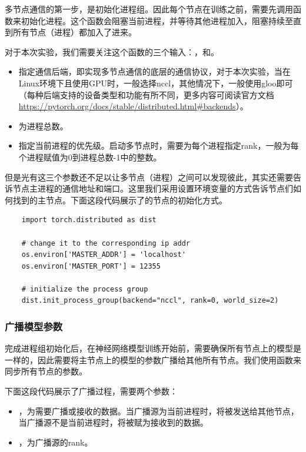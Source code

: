 多节点通信的第一步，是初始化进程组。因此每个节点在训练之前，需要先调用函数来初始化进程。这个函数会阻塞当前进程，并等待其他进程加入，阻塞持续至直到所有节点（进程）都加入了进来。

对于本次实验，我们需要关注这个函数的三个输入：，和。
\begin{itemize}
    \item {}指定通信后端，即实现多节点通信的底层的通信协议，对于本次实验，当在Linux环境下且使用GPU时，一般选择nccl，其他情况下，一般使用gloo即可（每种后端支持的设备类型和功能有所不同，更多内容可阅读官方文档\url{https://pytorch.org/docs/stable/distributed.html#backends}）。
    \item {}为进程总数。
    \item {}指定当前进程的优先级。启动多节点时，需要为每个进程指定rank，一般为每个进程赋值为0到进程总数-1中的整数。
\end{itemize}

但是光有这三个参数还不足以让多节点（进程）之间可以发现彼此，其实还需要告诉节点主进程的通信地址和端口。这里我们采用设置环境变量的方式告诉节点们如何找到的主节点。下面这段代码展示了的节点的初始化方式。
\begin{lstlisting}
    import torch.distributed as dist

    # change it to the corresponding ip addr
    os.environ['MASTER_ADDR'] = 'localhost'
    os.environ['MASTER_PORT'] = 12355
    
    # initialize the process group
    dist.init_process_group(backend="nccl", rank=0, world_size=2)
\end{lstlisting}

\subsubsection{广播模型参数}

完成进程组初始化后，在神经网络模型训练开始前，需要确保所有节点上的模型是一样的，因此需要将主节点上的模型的参数广播给其他所有节点。我们使用函数来同步所有节点的参数。

下面这段代码展示了广播过程，需要两个参数：
\begin{itemize}
    \item {}，为需要广播或接收的数据。当广播源为当前进程时，将被发送给其他节点，当广播源不是当前进程时，将被赋为接收到的数据。
    \item {}，为广播源的rank。
\end{itemize}

